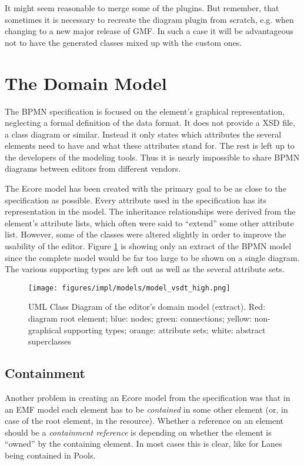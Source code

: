 It might seem reasonable to merge some of the plugins. But remember, that sometimes it is necessary to recreate the diagram plugin from scratch, e.g. when changing to a new major release of GMF. In such a case it will be advantageous not to have the generated classes mixed up with the custom ones.


\newpage
\section{The Domain Model}

The BPMN specification is focused on the element's graphical representation, neglecting a formal definition of the data format. It does not provide a XSD file, a class diagram or similar. Instead it only states which attributes the several elements need to have and what these attributes stand for. The rest is left up to the developers of the modeling tools. Thus it is nearly impossible to share BPMN diagrams between editors from different vendors.

The Ecore model has been created with the primary goal to be as close to the specification as possible. Every attribute used in the specification has its representation in the model. The inheritance relationships were derived from the element's attribute lists, which often were said to ``extend'' some other attribute list. However, some of the classes were altered slightly in order to improve the usability of the editor. Figure \ref{fig:model_vsdt} is showing only an extract of the BPMN model since the complete model would be far too large to be shown on a single diagram. The various supporting types are left out as well as the several attribute sets.

\begin{figure}[ht]
	\centering
	\texttt{[image: figures/impl/models/model\_vsdt\_high.png]}
	\caption[The Domain Model]{UML Class Diagram of the editor's domain model (extract). Red: diagram root element; blue: nodes; green: connections; yellow: non-graphical supporting types; orange: attribute sets; white: abstract superclasses}
	\label{fig:model_vsdt}
\end{figure}


\subsection{Containment}

Another problem in creating an Ecore model from the specification was that in an EMF model each element has to be \emph{contained} in some other element (or, in case of the root element, in the resource). Whether a reference on an element should be a \emph{containment reference} is depending on whether the element is ``owned'' by the containing element. In most cases this is clear, like for Lanes being contained in Pools.

